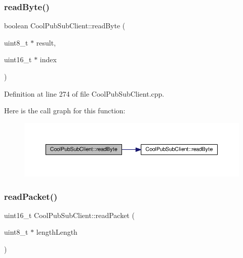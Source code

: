 \subsubsection{\texorpdfstring{read\+Byte()}{readByte()}\hspace{0.1cm}{\footnotesize\ttfamily [2/2]}}
{\footnotesize\ttfamily boolean Cool\+Pub\+Sub\+Client\+::read\+Byte (\begin{DoxyParamCaption}\item[{uint8\+\_\+t $\ast$}]{result,  }\item[{uint16\+\_\+t $\ast$}]{index }\end{DoxyParamCaption})\hspace{0.3cm}{\ttfamily [private]}}



Definition at line 274 of file Cool\+Pub\+Sub\+Client.\+cpp.

Here is the call graph for this function\+:\nopagebreak
\begin{figure}[H]
\begin{center}
\leavevmode
\includegraphics[width=350pt]{class_cool_pub_sub_client_abef3735bb9a2a8c87b3da659dc4ade03_cgraph}
\end{center}
\end{figure}
\mbox{\label{class_cool_pub_sub_client_a25a8779149cfa809b7c06f63568b25cf}} 
\subsubsection{\texorpdfstring{read\+Packet()}{readPacket()}}
{\footnotesize\ttfamily uint16\+\_\+t Cool\+Pub\+Sub\+Client\+::read\+Packet (\begin{DoxyParamCaption}\item[{uint8\+\_\+t $\ast$}]{length\+Length }\end{DoxyParamCaption})\hspace{0.3cm}{\ttfamily [private]}}




